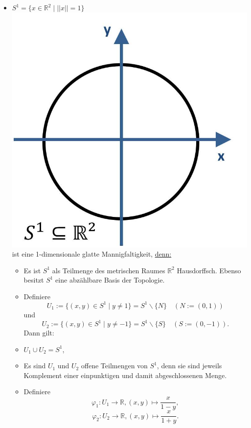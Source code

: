 \documentclass[a4paper,11pt,notitlepage]{report}
\theoremstyle{definition}
\newcommand{\R}{{\ensuremath{\mathbb{R}}}}
\begin{document}
\begin{enumerate}
\begin{itemize}
		\item $S^1 = \{ x \in \R^2 \mid ||x|| = 1\}$ \newline
		\includegraphics[scale=0.4]{images/S1.jpg} \newline
		ist eine 1-dimensionale glatte Mannigfaltigkeit, \underline{denn:}
			\begin{itemize}
				\item Es ist $S^1$ als Teilmenge des metrischen Raumes $\R^2$ Hausdorffsch.
					\newline
					Ebenso besitzt $S^1$ eine abzählbare Basis der Topologie.
				\item Definiere $$U_1 := \{(x,y) \in S^1 \mid y \neq 1\} = S^1 \backslash \{N\} \quad \left(N := (0,1)\right)$$ und $$U_2 := \{(x,y) \in S^1 \mid y \neq -1\} = S^1 \backslash \{S\} \quad \left(S := (0,-1)\right).$$
				Dann gilt:
				\item $U_1 \cup U_2 = S^1$,
				\item Es sind $U_1$ und $U_2$ offene Teilmengen von $S^1$, denn sie sind jeweils Komplement einer einpunktigen und damit abgeschlossenen Menge.
				\item Definiere $$\varphi_1 \colon U_1 \rightarrow \R, (x,y) \mapsto \frac{x}{1-y},$$
				$$\varphi_2 \colon U_2 \rightarrow \R, (x,y) \mapsto \frac{x}{1+y}.$$

\end{itemize}
\end{itemize}
\end{enumerate}
\end{document}
